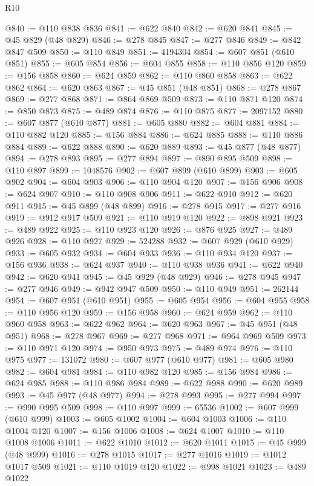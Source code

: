 \begin{lexlean}{R10}
\begin{coremodule}
@840 := @110 @838 @836
@841 := @622 @840
@842 := @620 @841
@845 := @45 @829 (@48 @829)
@846 := @278 @845
@847 := @277 @846
@849 := @842 @847 @509
@850 := @110 @849
@851 := 4194304
@854 := @607 @851 (@610 @851)
@855 := @605 @854
@856 := @604 @855
@858 := @110 @856 @120
@859 := @156 @858
@860 := @624 @859
@862 := @110 @860 @858
@863 := @622 @862
@864 := @620 @863
@867 := @45 @851 (@48 @851)
@868 := @278 @867
@869 := @277 @868
@871 := @864 @869 @509
@873 := @110 @871 @120
@874 := @850 @873
@875 := @489 @874
@876 := @110 @875
@877 := 2097152
@880 := @607 @877 (@610 @877)
@881 := @605 @880
@882 := @604 @881
@884 := @110 @882 @120
@885 := @156 @884
@886 := @624 @885
@888 := @110 @886 @884
@889 := @622 @888
@890 := @620 @889
@893 := @45 @877 (@48 @877)
@894 := @278 @893
@895 := @277 @894
@897 := @890 @895 @509
@898 := @110 @897
@899 := 1048576
@902 := @607 @899 (@610 @899)
@903 := @605 @902
@904 := @604 @903
@906 := @110 @904 @120
@907 := @156 @906
@908 := @624 @907
@910 := @110 @908 @906
@911 := @622 @910
@912 := @620 @911
@915 := @45 @899 (@48 @899)
@916 := @278 @915
@917 := @277 @916
@919 := @912 @917 @509
@921 := @110 @919 @120
@922 := @898 @921
@923 := @489 @922
@925 := @110 @923 @120
@926 := @876 @925
@927 := @489 @926
@928 := @110 @927
@929 := 524288
@932 := @607 @929 (@610 @929)
@933 := @605 @932
@934 := @604 @933
@936 := @110 @934 @120
@937 := @156 @936
@938 := @624 @937
@940 := @110 @938 @936
@941 := @622 @940
@942 := @620 @941
@945 := @45 @929 (@48 @929)
@946 := @278 @945
@947 := @277 @946
@949 := @942 @947 @509
@950 := @110 @949
@951 := 262144
@954 := @607 @951 (@610 @951)
@955 := @605 @954
@956 := @604 @955
@958 := @110 @956 @120
@959 := @156 @958
@960 := @624 @959
@962 := @110 @960 @958
@963 := @622 @962
@964 := @620 @963
@967 := @45 @951 (@48 @951)
@968 := @278 @967
@969 := @277 @968
@971 := @964 @969 @509
@973 := @110 @971 @120
@974 := @950 @973
@975 := @489 @974
@976 := @110 @975
@977 := 131072
@980 := @607 @977 (@610 @977)
@981 := @605 @980
@982 := @604 @981
@984 := @110 @982 @120
@985 := @156 @984
@986 := @624 @985
@988 := @110 @986 @984
@989 := @622 @988
@990 := @620 @989
@993 := @45 @977 (@48 @977)
@994 := @278 @993
@995 := @277 @994
@997 := @990 @995 @509
@998 := @110 @997
@999 := 65536
@1002 := @607 @999 (@610 @999)
@1003 := @605 @1002
@1004 := @604 @1003
@1006 := @110 @1004 @120
@1007 := @156 @1006
@1008 := @624 @1007
@1010 := @110 @1008 @1006
@1011 := @622 @1010
@1012 := @620 @1011
@1015 := @45 @999 (@48 @999)
@1016 := @278 @1015
@1017 := @277 @1016
@1019 := @1012 @1017 @509
@1021 := @110 @1019 @120
@1022 := @998 @1021
@1023 := @489 @1022

\end{coremodule}
\end{lexlean}

